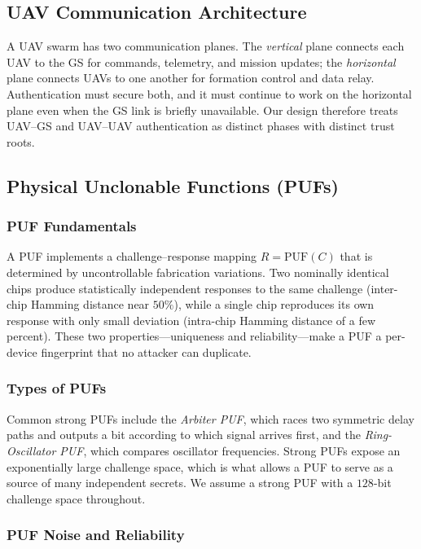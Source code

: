 \documentclass[11pt,a4paper]{article}
\begin{document}
\subsection{UAV Communication Architecture}

A UAV swarm has two communication planes. The \emph{vertical} plane connects
each UAV to the GS for commands, telemetry, and mission updates; the
\emph{horizontal} plane connects UAVs to one another for formation control and
data relay. Authentication must secure both, and it must continue to work on
the horizontal plane even when the GS link is briefly unavailable. Our design
therefore treats UAV--GS and UAV--UAV authentication as distinct phases with
distinct trust roots.

\subsection{Physical Unclonable Functions (PUFs)}

\subsubsection{PUF Fundamentals}

A PUF implements a challenge--response mapping $R = \mathrm{PUF}(C)$ that is
determined by uncontrollable fabrication variations. Two nominally identical
chips produce statistically independent responses to the same challenge
(inter-chip Hamming distance near $50\%$), while a single chip reproduces its
own response with only small deviation (intra-chip Hamming distance of a few
percent). These two properties---uniqueness and reliability---make a PUF a
per-device fingerprint that no attacker can duplicate.

\subsubsection{Types of PUFs}

Common strong PUFs include the \emph{Arbiter PUF}, which races two symmetric
delay paths and outputs a bit according to which signal arrives first, and the
\emph{Ring-Oscillator PUF}, which compares oscillator frequencies. Strong PUFs
expose an exponentially large challenge space, which is what allows a PUF to
serve as a source of many independent secrets. We assume a strong PUF with a
$128$-bit challenge space throughout.

\subsubsection{PUF Noise and Reliability}
\end{document}

